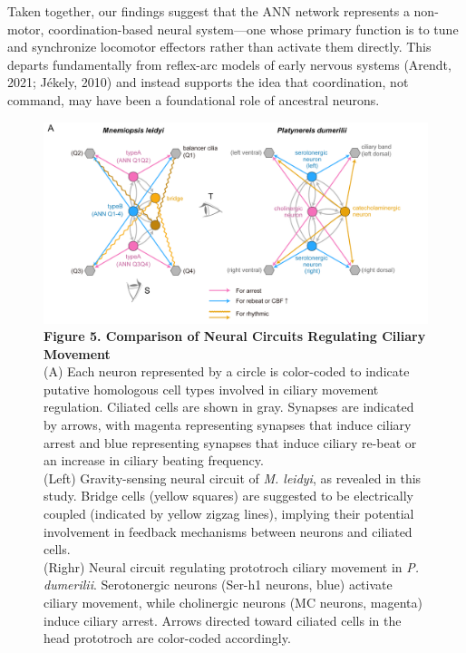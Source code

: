 \documentclass[
  11pt,
]{article}
\begin{document}
Taken together, our findings suggest that the ANN network represents a
non-motor, coordination-based neural system---one whose primary function
is to tune and synchronize locomotor effectors rather than activate them
directly. This departs fundamentally from reflex-arc models of early
nervous systems (Arendt, 2021; Jékely, 2010) and instead supports the
idea that coordination, not command, may have been a foundational role
of ancestral neurons.

\begin{figure}[H]

{\centering \includegraphics{figures/Figure5.png}

}

\caption{\textbf{Figure 5. Comparison of Neural Circuits Regulating
Ciliary Movement}\\
(A) Each neuron represented by a circle is color-coded to indicate
putative homologous cell types involved in ciliary movement regulation.
Ciliated cells are shown in gray. Synapses are indicated by arrows, with
magenta representing synapses that induce ciliary arrest and blue
representing synapses that induce ciliary re-beat or an increase in
ciliary beating frequency.\\
(Left) Gravity-sensing neural circuit of \emph{M. leidyi}, as revealed
in this study. Bridge cells (yellow squares) are suggested to be
electrically coupled (indicated by yellow zigzag lines), implying their
potential involvement in feedback mechanisms between neurons and
ciliated cells.\\
(Righr) Neural circuit regulating prototroch ciliary movement in
\emph{P. dumerilii}. Serotonergic neurons (Ser-h1 neurons, blue)
activate ciliary movement, while cholinergic neurons (MC neurons,
magenta) induce ciliary arrest. Arrows directed toward ciliated cells in
the head prototroch are color-coded accordingly.}

\end{figure}%
\end{document}
